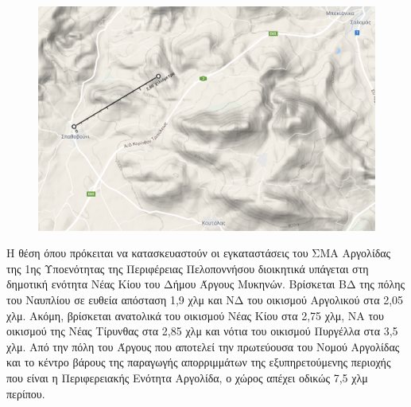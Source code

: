 \documentclass[12pt]{article}
\begin{document}
 	\begin{figure} [H]
 		\begin{center}
 			\includegraphics [scale = 0.35] {map39.png}
 		\end{center}
 	\end{figure}
 
 	Η θέση όπου πρόκειται να κατασκευαστούν οι εγκαταστάσεις του ΣΜΑ Αργολίδας της  1ης  Υποενότητας της Περιφέρειας Πελοποννήσου διοικητικά υπάγεται στη δημοτική ενότητα Νέας Κίου του Δήμου Άργους Μυκηνών. Βρίσκεται ΒΔ της πόλης του Ναυπλίου σε ευθεία απόσταση 1,9 χλμ και ΝΔ του οικισμού Αργολικού στα 2,05 χλμ. Ακόμη, βρίσκεται ανατολικά του οικισμού Νέας Κίου στα 2,75 χλμ, ΝΑ του οικισμού της Νέας Τίρυνθας στα 2,85 χλμ και νότια του οικισμού Πυργέλλα στα 3,5 χλμ. Από την πόλη του Άργους που αποτελεί την πρωτεύουσα του Νομού Αργολίδας και το κέντρο βάρους της παραγωγής απορριμμάτων της εξυπηρετούμενης περιοχής που είναι η Περιφερειακής Ενότητα Αργολίδα, ο χώρος απέχει οδικώς 7,5 χλμ περίπου.
 	
\end{document}
